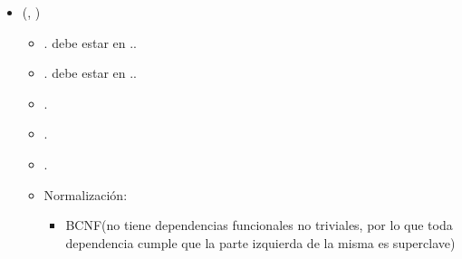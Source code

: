 \begin{itemize}
        \item {}(, )
            \begin{itemize}
                \item {}. debe estar en 
                    ..
                \item {}. debe estar en 
                    ..
                \item {}.
                \item {}.
                \item {}.
                \item Normalización:
                    \begin{itemize}
                        \item BCNF(no tiene dependencias funcionales no 
                            triviales, por lo que toda dependencia cumple que la
                            parte izquierda de la misma es superclave)
                    \end{itemize}

            \end{itemize}


\end{itemize}
